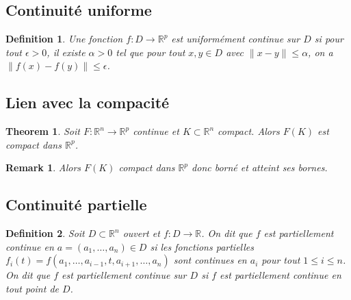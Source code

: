 \documentclass{article}
\newtheorem{theorem}{Theorem}
\newtheorem{definition}{Definition}
\newtheorem{remark}{Remark}
\begin{document}
\subsection{Continuité uniforme}
\begin{definition}
Une fonction $f: D \rightarrow \mathbb{R}^p$ est uniformément continue sur $D$ si pour tout $\epsilon > 0$, il existe $\alpha > 0$ tel que pour tout $x, y \in D$ avec $\|x - y\| \leq \alpha$, on a $\|f(x) - f(y)\| \leq \epsilon$.
\end{definition}

\subsection{Lien avec la compacité}

\begin{theorem}
Soit $F: \mathbb{R}^n \rightarrow \mathbb{R}^p$ continue et $K \subset \mathbb{R}^n$ compact. Alors $F(K)$ est compact dans $\mathbb{R}^p$.
\end{theorem}

\begin{remark}
Alors $F(K)$ compact dans $\mathbb{R}^p$ donc borné et atteint ses bornes.
\end{remark}

\subsection{Continuité partielle}

\begin{definition}
Soit $D \subset \mathbb{R}^n$ ouvert et $f: D \rightarrow \mathbb{R}$. On dit que $f$ est partiellement continue en $a = (a_1, \ldots, a_n) \in D$ si les fonctions partielles $f_i(t) = f(a_1, \ldots, a_{i-1}, t, a_{i+1}, \ldots, a_n)$ sont continues en $a_i$ pour tout $1 \leq i \leq n$.
On dit que $f$ est partiellement continue sur $D$ si $f$ est partiellement continue en tout point de $D$.
\end{definition}
\end{document}
